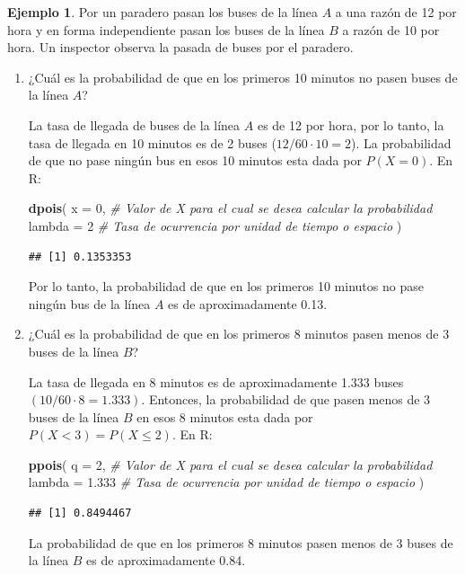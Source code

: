 \documentclass[
  11pt,
]{book}
\newenvironment{Shaded}{\begin{snugshade}}{\end{snugshade}}
\newcommand{\AttributeTok}[1]{\textcolor[rgb]{0.13,0.29,0.53}{#1}}
\newcommand{\CommentTok}[1]{\textcolor[rgb]{0.56,0.35,0.01}{\textit{#1}}}
\newcommand{\DecValTok}[1]{\textcolor[rgb]{0.00,0.00,0.81}{#1}}
\newcommand{\FloatTok}[1]{\textcolor[rgb]{0.00,0.00,0.81}{#1}}
\newcommand{\FunctionTok}[1]{\textcolor[rgb]{0.13,0.29,0.53}{\textbf{#1}}}
\newcommand{\NormalTok}[1]{#1}
\theoremstyle{definition}
\theoremstyle{definition}
\newtheorem{example}{Ejemplo}[chapter]
\theoremstyle{definition}
\theoremstyle{definition}
\theoremstyle{remark}
\begin{document}
\begin{example}

Por un paradero pasan los buses de la línea \(A\) a una razón de 12 por hora y en forma independiente pasan los buses de la línea \(B\) a razón de 10 por hora. Un inspector observa la pasada de buses por el paradero.

\begin{enumerate}
\def\labelenumi{\arabic{enumi}.}
\item
  ¿Cuál es la probabilidad de que en los primeros 10 minutos no pasen buses de la línea \(A\)?

  La tasa de llegada de buses de la línea \(A\) es de 12 por hora, por lo tanto, la tasa de llegada en 10 minutos es de 2 buses (\(12/60\cdot 10=2\)). La probabilidad de que no pase ningún bus en esos 10 minutos esta dada por \(P(X = 0)\). En R:

\begin{Shaded}
\begin{Highlighting}[]
\FunctionTok{dpois}\NormalTok{(}
  \AttributeTok{x =} \DecValTok{0}\NormalTok{, }\CommentTok{\# Valor de X para el cual se desea calcular la probabilidad}
  \AttributeTok{lambda =} \DecValTok{2} \CommentTok{\# Tasa de ocurrencia por unidad de tiempo o espacio}
\NormalTok{)}
\end{Highlighting}
\end{Shaded}

\begin{verbatim}
## [1] 0.1353353
\end{verbatim}

  Por lo tanto, la probabilidad de que en los primeros 10 minutos no pase ningún bus de la línea \(A\) es de aproximadamente 0.13.
\item
  ¿Cuál es la probabilidad de que en los primeros 8 minutos pasen menos de 3 buses de la línea \(B\)?

  La tasa de llegada en 8 minutos es de aproximadamente 1.333 buses \((10/60\cdot 8=1.333)\). Entonces, la probabilidad de que pasen menos de 3 buses de la línea \(B\) en esos 8 minutos esta dada por \(P(X < 3) = P(X\leq 2)\). En R:

\begin{Shaded}
\begin{Highlighting}[]
\FunctionTok{ppois}\NormalTok{(}
  \AttributeTok{q =} \DecValTok{2}\NormalTok{, }\CommentTok{\# Valor de X para el cual se desea calcular la probabilidad}
  \AttributeTok{lambda =} \FloatTok{1.333} \CommentTok{\# Tasa de ocurrencia por unidad de tiempo o espacio}
\NormalTok{)}
\end{Highlighting}
\end{Shaded}

\begin{verbatim}
## [1] 0.8494467
\end{verbatim}

  La probabilidad de que en los primeros 8 minutos pasen menos de 3 buses de la línea \(B\) es de aproximadamente 0.84.
\end{enumerate}

\end{example}
\end{document}
